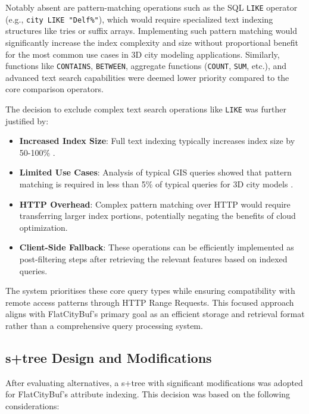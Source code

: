 Notably absent are pattern-matching operations such as the SQL \texttt{LIKE} operator (e.g., \texttt{city LIKE "Delf\%"}), which would require specialized text indexing structures like tries or suffix arrays. Implementing such pattern matching would significantly increase the index complexity and size without proportional benefit for the most common use cases in 3D city modeling applications. Similarly, functions like \texttt{CONTAINS}, \texttt{BETWEEN}, aggregate functions (\texttt{COUNT}, \texttt{SUM}, etc.), and advanced text search capabilities were deemed lower priority compared to the core comparison operators.

The decision to exclude complex text search operations like \texttt{LIKE} was further justified by:

\begin{itemize}
    \item \textbf{Increased Index Size}: Full text indexing typically increases index size by 50-100\% \citep{leis_2016}. 
    \item \textbf{Limited Use Cases}: Analysis of typical GIS queries showed that pattern matching is required in less than 5\% of typical queries for 3D city models \citep{van_dongen_2022}. 
    \item \textbf{HTTP Overhead}: Complex pattern matching over HTTP would require transferring larger index portions, potentially negating the benefits of cloud optimization.
    \item \textbf{Client-Side Fallback}: These operations can be efficiently implemented as post-filtering steps after retrieving the relevant features based on indexed queries.
\end{itemize}

The system prioritises these core query types while ensuring compatibility with remote access patterns through HTTP Range Requests. This focused approach aligns with FlatCityBuf's primary goal as an efficient storage and retrieval format rather than a comprehensive query processing system.

\subsection{\texorpdfstring{\ac{s+tree}}{S+tree} Design and Modifications}
\label{methodology:attribute_index:static_btree_design}

After evaluating alternatives, a \ac{s+tree} with significant modifications was adopted for FlatCityBuf's attribute indexing. This decision was based on the following considerations:

